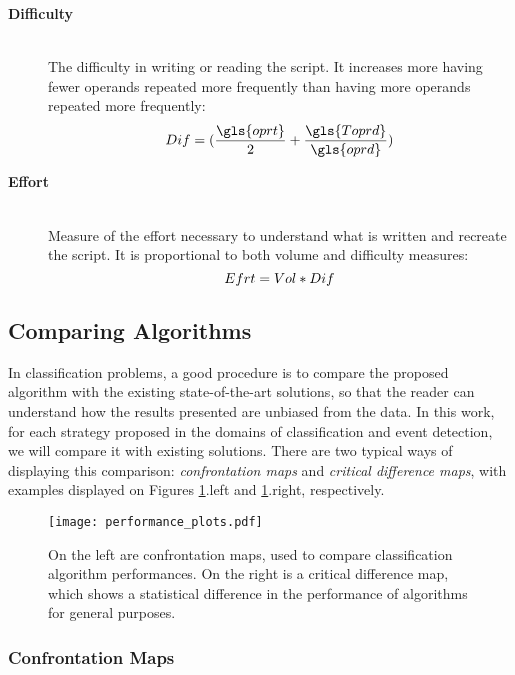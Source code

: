 \begin{description}
     \item [\textbf{Difficulty}] \hfill \\
    	The difficulty in writing or reading the script. It increases more having fewer operands repeated more frequently than having more operands repeated more frequently:
        \begin{equation}
        	\centering
            Dif = (\frac{\gls{oprt}}{2} + \frac{\gls{Toprd}}{\gls{oprd}})
        \end{equation}
        
	 \item [\textbf{Effort}] \hfill \\
    	Measure of the effort necessary to understand what is written and recreate the script. It is proportional to both volume and difficulty measures:
        \begin{equation}
        	\centering
        	Efrt = Vol*Dif
        \end{equation}
\end{description}


\subsection{Comparing Algorithms}

In classification problems, a good procedure is to compare the proposed algorithm with the existing state-of-the-art solutions, so that the reader can understand how the results presented are unbiased from the data. In this work, for each strategy proposed in the domains of classification and event detection, we will compare it with existing solutions. There are two typical ways of displaying this comparison: \textit{confrontation maps} and \textit{critical difference maps}, with examples displayed on Figures \ref{fig:performance_plots}.left and \ref{fig:performance_plots}.right, respectively.

\begin{figure}
\texttt{[image: performance\_plots.pdf]}
\caption{On the left are confrontation maps, used to compare classification algorithm performances. On the right is a critical difference map, which shows a statistical difference in the performance of algorithms for general purposes.}
\label{fig:performance_plots}
\end{figure}

\subsubsection{Confrontation Maps}

